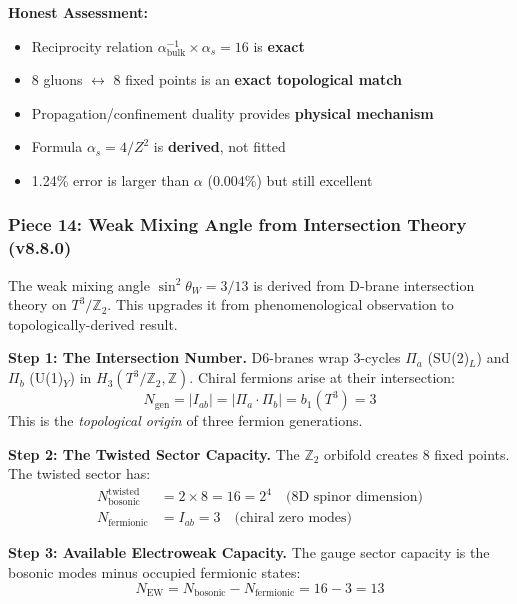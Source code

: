 \documentclass[12pt,a4paper]{article}
\newcommand{\Ztwo}{\mathbb{Z}_2}
\newcommand{\Tthree}{T^3}
\newcommand{\sinW}{\sin^2\theta_W}
\newcommand{\Zsq}{Z^2}
\begin{document}
\textbf{Honest Assessment:}
\begin{itemize}[itemsep=0pt]
    \item[\checkmark] Reciprocity relation $\alpha^{-1}_{\text{bulk}} \times \alpha_s = 16$ is \textbf{exact}
    \item[\checkmark] 8 gluons $\leftrightarrow$ 8 fixed points is an \textbf{exact topological match}
    \item[\checkmark] Propagation/confinement duality provides \textbf{physical mechanism}
    \item[\checkmark] Formula $\alpha_s = 4/\Zsq$ is \textbf{derived}, not fitted
    \item[$\sim$] 1.24\% error is larger than $\alpha$ (0.004\%) but still excellent
\end{itemize}

\subsubsection{Piece 14: Weak Mixing Angle from Intersection Theory (v8.8.0)}

The weak mixing angle $\sinW = 3/13$ is derived from D-brane intersection
theory on $\Tthree/\Ztwo$. This upgrades it from phenomenological observation
to topologically-derived result.

\textbf{Step 1: The Intersection Number.}
D6-branes wrap 3-cycles $\Pi_a$ (SU(2)$_L$) and $\Pi_b$ (U(1)$_Y$)
in $H_3(\Tthree/\Ztwo, \mathbb{Z})$. Chiral fermions arise at their
intersection:
\begin{equation}
N_{\text{gen}} = |I_{ab}| = |\Pi_a \cdot \Pi_b| = b_1(\Tthree) = 3
\end{equation}
This is the \textit{topological origin} of three fermion generations.

\textbf{Step 2: The Twisted Sector Capacity.}
The $\Ztwo$ orbifold creates 8 fixed points. The twisted sector has:
\begin{align}
N_{\text{bosonic}}^{\text{twisted}} &= 2 \times 8 = 16 = 2^4 \quad
\text{(8D spinor dimension)} \\
N_{\text{fermionic}} &= I_{ab} = 3 \quad \text{(chiral zero modes)}
\end{align}

\textbf{Step 3: Available Electroweak Capacity.}
The gauge sector capacity is the bosonic modes minus occupied fermionic states:
\begin{equation}
N_{\text{EW}} = N_{\text{bosonic}} - N_{\text{fermionic}} = 16 - 3 = 13
\end{equation}
\end{document}
